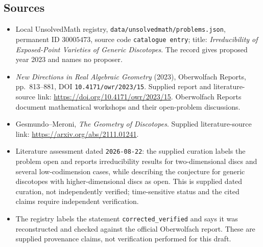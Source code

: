 \documentclass[11pt]{article}
\begin{document}
\subsection{Sources}
\begin{itemize}
\item Local UnsolvedMath registry, \texttt{data/unsolvedmath/problems.json}, permanent ID \(30005473\), source code \texttt{catalogue entry}; title: \emph{Irreducibility of Exposed-Point Varieties of Generic Discotopes}. The record gives proposed year 2023 and names no proposer.
\item \emph{New Directions in Real Algebraic Geometry} (2023), Oberwolfach Reports, pp.\ 813--881, DOI \texttt{10.4171/owr/2023/15}. Supplied report and literature-source link: \url{https://doi.org/10.4171/owr/2023/15}. Oberwolfach Reports document mathematical workshops and their open-problem discussions.
\item Gesmundo--Meroni, \emph{The Geometry of Discotopes}. Supplied literature-source link: \url{https://arxiv.org/abs/2111.01241}.
\item Literature assessment dated \texttt{2026-08-22}: the supplied curation labels the problem open and reports irreducibility results for two-dimensional discs and several low-codimension cases, while describing the conjecture for generic discotopes with higher-dimensional discs as open. This is supplied dated curation, not independently verified; time-sensitive status and the cited claims require independent verification.
\item The registry labels the statement \texttt{corrected\_verified} and says it was reconstructed and checked against the official Oberwolfach report. These are supplied provenance claims, not verification performed for this draft.
\end{itemize}
\end{document}

